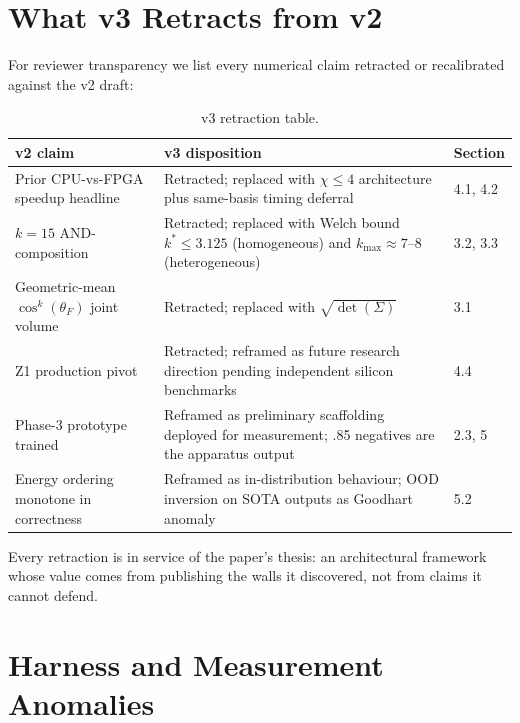 \documentclass[10pt]{article}
\begin{document}


\section{What v3 Retracts from v2}

For reviewer transparency we list every numerical claim retracted
or recalibrated against the v2 draft:

\begin{table}[ht]
  \centering
  \small
  \begin{tabular}{p{4.5cm} p{6.5cm} p{2cm}}
    \toprule
    v2 claim & v3 disposition & Section \\
    \midrule
    Prior CPU-vs-FPGA speedup headline &
      Retracted; replaced with $\chi \leq 4$ architecture plus
      same-basis timing deferral &
      4.1, 4.2 \\
    $k = 15$ AND-composition &
      Retracted; replaced with Welch bound $k^* \leq 3.125$
      (homogeneous) and $k_{\max} \approx 7\text{--}8$
      (heterogeneous) &
      3.2, 3.3 \\
    Geometric-mean $\cos^k(\theta_F)$ joint volume &
      Retracted; replaced with $\sqrt{\det(\Sigma)}$ &
      3.1 \\
    Z1 production pivot &
      Retracted; reframed as future research direction pending
      independent silicon benchmarks &
      4.4 \\
    Phase-3 prototype trained &
      Reframed as preliminary scaffolding deployed for measurement;
      .85 negatives are the apparatus output &
      2.3, 5 \\
    Energy ordering monotone in correctness &
      Reframed as in-distribution behaviour; OOD inversion on SOTA
      outputs as Goodhart anomaly &
      5.2 \\
    \bottomrule
  \end{tabular}
  \caption{v3 retraction table.}
  \label{tab:retractions}
\end{table}

Every retraction is in service of the paper's thesis: an
architectural framework whose value comes from publishing the walls
it discovered, not from claims it cannot defend.

\section{Harness and Measurement Anomalies}
\label{app:harness-anomalies}
\end{document}
